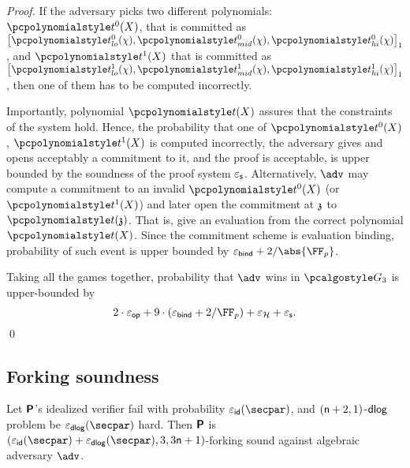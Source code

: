 \documentclass[runningheads,11pt]{llncs}
\begin{document}
\begin{proof}
  If the adversary picks two different polynomials: $\p{t^0}(X)$, that is committed
  as $\gone{\p{t^0_{lo}}(\chi), \p{t^0_{mid}}(\chi), \p{t^0_{hi}}(\chi)}$, and
  $\p{t^1}(X)$ that is committed as
  $\gone{\p{t^1_{lo}}(\chi), \p{t^1_{mid}}(\chi), \p{t^1_{hi}}(\chi)}$, then one of
  them has to be computed incorrectly. 

  Importantly, polynomial $\p{t}(X)$ assures that the constraints of the system
  hold. Hence, the probability that one of $\p{t^0}(X)$, $\p{t^1}(X)$ is computed
  incorrectly, the adversary gives and opens acceptably a commitment to it, and
  the proof is acceptable, is upper bounded by the soundness of the proof system
  $\varepsilon_{\mathsf{s}}$. Alternatively, $\adv$ may compute a commitment to an invalid
  $\p{t^0}(X)$ (or $\p{t^1}(X)$) and later open the commitment at $\mathfrak{z}$ to
  $\p{t}(\chz)$. That is, give an evaluation from the correct polynomial
  $\p{t}(X)$. Since the commitment scheme is evaluation binding, probability of
  such event is upper bounded by $\epsbinding + \infrac{2}{\abs{\FF_p}}$.

   Taking all the games together, probability that $\adv$ wins
  in $\game{3}$ is upper-bounded by
  \[
    2 \cdot \epsop + 9 \cdot (\epsbind + \infrac{2}{\FF_p}) + \epsro + \epss.
  \]
  \qed
\end{proof}

\subsection{Forking soundness}
\begin{lemma}
\label{lem:plonkprot_ss}
Let $\bm{\mathsf{P}}$'s idealized verifier fail with probability $\epsid (\secpar)$, and
$(\mathsf{n} + 2, 1)$-$\mathsf{dlog}$ problem be $\epsdlog (\secpar)$ hard. Then $\bm{\mathsf{P}}$ is
$(\epsid (\secpar) + \epsdlog (\secpar) , 3, 3 \noofc + 1)$-forking sound against algebraic
adversary $\adv$.
\end{lemma}
\end{document}
